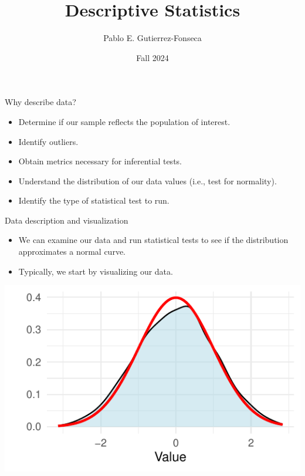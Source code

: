 \documentclass[
  ignorenonframetext,
]{beamer}
\title{Descriptive Statistics}
\author{Pablo E. Gutierrez-Fonseca}
\date{Fall 2024}
\providecommand{\tightlist}{%
  \setlength{\itemsep}{0pt}\setlength{\parskip}{0pt}}
\begin{document}
\frame{\titlepage}

\begin{frame}{Why describe data?}
\label{why-describe-data}
\begin{itemize}
\tightlist
\item
  Determine if our sample reflects the population of interest.
\end{itemize}

\begin{itemize}
\tightlist
\item
  Identify outliers.
\end{itemize}

\begin{itemize}
\tightlist
\item
  Obtain metrics necessary for inferential tests.
\end{itemize}

\begin{itemize}
\tightlist
\item
  Understand the distribution of our data values (i.e., test for
  normality).
\end{itemize}

\begin{itemize}
\tightlist
\item
  Identify the type of statistical test to run.
\end{itemize}
\end{frame}

\begin{frame}{Data description and visualization}
\label{data-description-and-visualization}
\begin{itemize}
\tightlist
\item
  We can examine our data and run statistical tests to see if the
  distribution approximates a normal curve.\\
\item
  Typically, we start by visualizing our data.
\end{itemize}

\includegraphics{M4-Descriptice-Statistics_files/figure-beamer/unnamed-chunk-1-1.pdf}
\end{frame}
\end{document}

